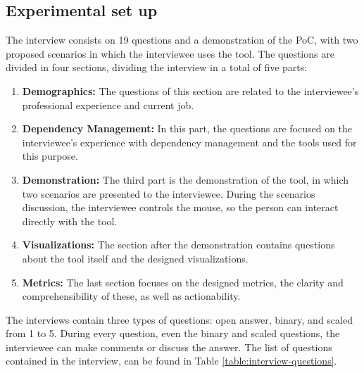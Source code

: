 \subsection{Experimental set up}
The interview consists on 19 questions and a demonstration of the PoC, with two proposed scenarios in which the interviewee uses the tool. The questions are divided in four sections, dividing the interview in a total of five parts:

\begin{enumerate}
  \item \textbf{Demographics:} The questions of this section are related to the interviewee's professional experience and current job.
  \item \textbf{Dependency Management:} In this part, the questions are focused on the interviewee's experience with dependency management and the tools used for this purpose.
  \item \textbf{Demonstration:} The third part is the demonstration of the tool, in which two scenarios are presented to the interviewee. During the scenarios discussion, the interviewee controls the mouse, so the person can interact directly with the tool.
  \item \textbf{Visualizations:} The section after the demonstration contains questions about the tool itself and the designed visualizations.
  \item \textbf{Metrics:} The last section focuses on the designed metrics, the clarity and comprehensibility of these, as well as actionability.
\end{enumerate}

The interviews contain three types of questions: open answer, binary, and scaled from 1 to 5. During every question, even the binary and scaled questions, the interviewee can make comments or discuss the answer. The list of questions contained in the interview, can be found in Table \ref{table:interview-questions}.

